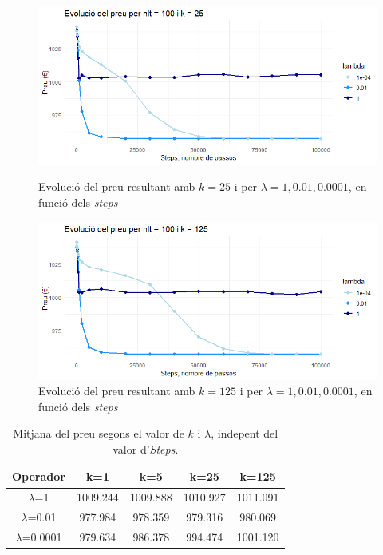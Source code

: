 \documentclass[a4paper]{article}
\begin{document}
	\begin{figure}[H]
		\centering
		\begin{minipage}{0.45\textwidth}
			\centering
			\includegraphics[width=\textwidth]{images/exp3_k25.png}
			\caption{Evolució del preu resultant amb $k=25$ i per $\lambda = {1, 0.01, 0.0001}$, en funció dels \textit{steps}}
			\label{fig:exp3_k25}
		\end{minipage}%
		\hspace{0.05\textwidth} %
		\begin{minipage}{0.45\textwidth}
			\centering
			\includegraphics[width=\textwidth]{images/exp3_k125.png}
			\caption{Evolució del preu resultant amb $k=125$ i per $\lambda = {1,0.01,0.0001}$, en funció dels \textit{steps}}
			\label{fig:exp3_k125}
		\end{minipage}
	\end{figure}
	
	\begin{table}[H]
		\centering
		\begin{tabular}{|c|c|c|c|c|}
			\hline
			\textbf{Operador} & \textbf{k=1} & \textbf{k=5} & \textbf{k=25} & \textbf{k=125} \\
			\hline
			$\lambda$=1 & 1009.244 & 1009.888 & 1010.927 & 1011.091 \\
			\hline
			$\lambda$=0.01 & 977.984 & 978.359 & 979.316 & 980.069 \\
			\hline
			$\lambda$=0.0001 & 979.634 & 986.378 & 994.474 & 1001.120 \\
			\hline
		\end{tabular}
		\caption{Mitjana del preu segons el valor de $k$ i $\lambda$, indepent del valor d'\textit{Steps}.}
		\label{tab:exp3_estadisticas}
	\end{table}
\end{document}
